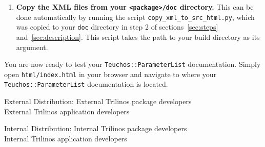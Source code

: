 \documentclass[pdf,ps2pdf,12pt]{smemo}
\begin{document}
\begin{memo}
\begin{enumerate}
    \item \textbf{Copy the XML files from your \texttt{<package>/doc}
        directory.}  This can be done automatically by running the
      script \texttt{copy\_xml\_to\_src\_html.py}, which was copied to
      your \texttt{doc} directory in step 2 of
      sections~\ref{sec:steps} and~\ref{sec:description}.  This script
      takes the path to your build directory as its argument.

 \end{enumerate}

 You are now ready to test your \texttt{Teuchos::ParameterList}
 documentation.  Simply open \texttt{html/index.html} in your browser
 and navigate to where your \texttt{Teuchos::ParameterList}
 documentation is located.










    \clearpage
    \begin{distribution}{External Distribution:}
	\normalfont
        External Trilinos package developers \\
        External Trilinos application developers
    \end{distribution}

    \begin{distribution}{Internal Distribution:}
	\normalfont
        Internal Trilinos package developers \\
        Internal Trilinos application developers
    \end{distribution}

    \end{memo}
\end{document}
